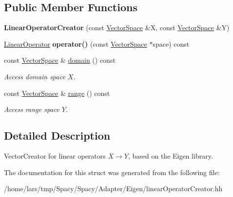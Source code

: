 \subsection*{Public Member Functions}
\begin{DoxyCompactItemize}
\item 
{\bfseries Linear\+Operator\+Creator} (const \hyperlink{classSpacy_1_1VectorSpace}{Vector\+Space} \&X, const \hyperlink{classSpacy_1_1VectorSpace}{Vector\+Space} \&Y)\hypertarget{structSpacy_1_1Rn_1_1LinearOperatorCreator_a7f00b9a6f0f656d756a65d42803e3620}{}\label{structSpacy_1_1Rn_1_1LinearOperatorCreator_a7f00b9a6f0f656d756a65d42803e3620}

\item 
\hyperlink{classSpacy_1_1Rn_1_1LinearOperator}{Linear\+Operator} {\bfseries operator()} (const \hyperlink{classSpacy_1_1VectorSpace}{Vector\+Space} $\ast$space) const \hypertarget{classSpacy_1_1Generic_1_1LinearOperatorCreator_a34e9eee442ba1bffeab9905266500bf6}{}\label{classSpacy_1_1Generic_1_1LinearOperatorCreator_a34e9eee442ba1bffeab9905266500bf6}

\item 
const \hyperlink{classSpacy_1_1VectorSpace}{Vector\+Space} \& \hyperlink{classSpacy_1_1OperatorBase_a2588f9b3e0188820c4c494e63293dc6f}{domain} () const \hypertarget{classSpacy_1_1OperatorBase_a2588f9b3e0188820c4c494e63293dc6f}{}\label{classSpacy_1_1OperatorBase_a2588f9b3e0188820c4c494e63293dc6f}

\begin{DoxyCompactList}\small\item\em Access domain space $X$. \end{DoxyCompactList}\item 
const \hyperlink{classSpacy_1_1VectorSpace}{Vector\+Space} \& \hyperlink{classSpacy_1_1OperatorBase_ab19d3b7a6f290b1079248f1e567e53d6}{range} () const \hypertarget{classSpacy_1_1OperatorBase_ab19d3b7a6f290b1079248f1e567e53d6}{}\label{classSpacy_1_1OperatorBase_ab19d3b7a6f290b1079248f1e567e53d6}

\begin{DoxyCompactList}\small\item\em Access range space $Y$. \end{DoxyCompactList}\end{DoxyCompactItemize}


\subsection{Detailed Description}
Vector\+Creator for linear operators $X\rightarrow Y$, based on the Eigen library. 

The documentation for this struct was generated from the following file\+:\begin{DoxyCompactItemize}
\item 
/home/lars/tmp/\+Spacy/\+Spacy/\+Adapter/\+Eigen/linear\+Operator\+Creator.\+hh\end{DoxyCompactItemize}

